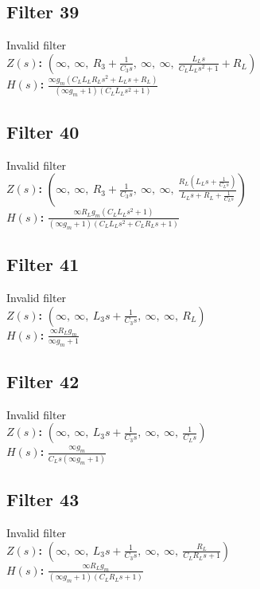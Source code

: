 \documentclass{article}
\begin{document}
\subsection*{Filter 39}
Invalid filter \\ 
\textbf{$Z(s)$:} $\left( \infty, \  \infty, \  R_{3} + \frac{1}{C_{3} s}, \  \infty, \  \infty, \  \frac{L_{L} s}{C_{L} L_{L} s^{2} + 1} + R_{L}\right)$ \\ 
\textbf{$H(s)$:} $\frac{\infty g_{m} \left(C_{L} L_{L} R_{L} s^{2} + L_{L} s + R_{L}\right)}{\left(\infty g_{m} + 1\right) \left(C_{L} L_{L} s^{2} + 1\right)}$ \\ 
\subsection*{Filter 40}
Invalid filter \\ 
\textbf{$Z(s)$:} $\left( \infty, \  \infty, \  R_{3} + \frac{1}{C_{3} s}, \  \infty, \  \infty, \  \frac{R_{L} \left(L_{L} s + \frac{1}{C_{L} s}\right)}{L_{L} s + R_{L} + \frac{1}{C_{L} s}}\right)$ \\ 
\textbf{$H(s)$:} $\frac{\infty R_{L} g_{m} \left(C_{L} L_{L} s^{2} + 1\right)}{\left(\infty g_{m} + 1\right) \left(C_{L} L_{L} s^{2} + C_{L} R_{L} s + 1\right)}$ \\ 
\subsection*{Filter 41}
Invalid filter \\ 
\textbf{$Z(s)$:} $\left( \infty, \  \infty, \  L_{3} s + \frac{1}{C_{3} s}, \  \infty, \  \infty, \  R_{L}\right)$ \\ 
\textbf{$H(s)$:} $\frac{\infty R_{L} g_{m}}{\infty g_{m} + 1}$ \\ 
\subsection*{Filter 42}
Invalid filter \\ 
\textbf{$Z(s)$:} $\left( \infty, \  \infty, \  L_{3} s + \frac{1}{C_{3} s}, \  \infty, \  \infty, \  \frac{1}{C_{L} s}\right)$ \\ 
\textbf{$H(s)$:} $\frac{\infty g_{m}}{C_{L} s \left(\infty g_{m} + 1\right)}$ \\ 
\subsection*{Filter 43}
Invalid filter \\ 
\textbf{$Z(s)$:} $\left( \infty, \  \infty, \  L_{3} s + \frac{1}{C_{3} s}, \  \infty, \  \infty, \  \frac{R_{L}}{C_{L} R_{L} s + 1}\right)$ \\ 
\textbf{$H(s)$:} $\frac{\infty R_{L} g_{m}}{\left(\infty g_{m} + 1\right) \left(C_{L} R_{L} s + 1\right)}$ \\ 
\end{document}
